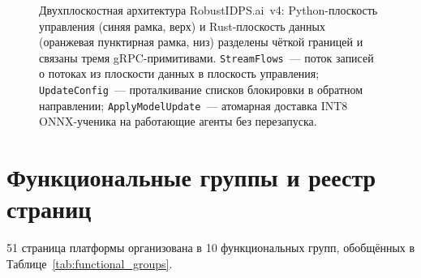 \begin{figure}[H]
\caption{Двухплоскостная архитектура \textsf{RobustIDPS.ai}~v4:
Python-плоскость управления (синяя рамка, верх) и Rust-плоскость
данных (оранжевая пунктирная рамка, низ) разделены чёткой границей и
связаны тремя gRPC-примитивами. \texttt{StreamFlows}~--- поток
записей о потоках из плоскости данных в плоскость управления;
\texttt{UpdateConfig}~--- проталкивание списков блокировки в
обратном направлении; \texttt{ApplyModelUpdate}~--- атомарная
доставка INT8 ONNX-ученика на работающие агенты без перезапуска.}
\label{fig:two_plane_arch}
\end{figure}


\section{Функциональные группы и реестр страниц}
\label{sec:functional_groups}

51 страница платформы организована в 10 функциональных групп, обобщённых в Таблице~\ref{tab:functional_groups}.

